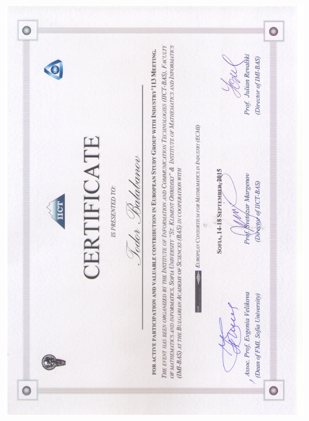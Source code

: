 \documentclass[bulgarian,a4paper]{europasscv}
\begin{document}
\includegraphics[width=\textwidth,height=\textheight,keepaspectratio]{ESGI1132015}
\end{document}
